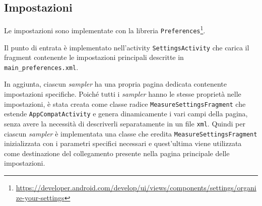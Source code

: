 
\subsection{Impostazioni}
Le impostazioni sono implementate con la libreria \texttt{Preferences}\footnote{\url{https://developer.android.com/develop/ui/views/components/settings/organize-your-settings}}.

Il punto di entrata è implementato nell'activity \texttt{SettingsActivity} che carica il fragment contenente le impostazioni principali descritte in \texttt{main\_preferences.xml}. 

In aggiunta, ciascun \textit{sampler} ha una propria pagina dedicata contenente impostazioni specifiche.
Poiché tutti i \textit{sampler} hanno le stesse proprietà nelle impostazioni, è stata creata come classe radice \texttt{MeasureSettingsFragment} che estende \texttt{AppCompatActivity} e genera dinamicamente i vari campi della pagina, senza avere la necessità di descriverli separatamente in un file \texttt{xml}. 
Quindi per ciascun \textit{sampler} è implementata una classe che eredita \texttt{MeasureSettingsFragment} inizializzata con i parametri specifici necessari e quest'ultima viene utilizzata come destinazione del collegamento presente nella pagina principale delle impostazioni.